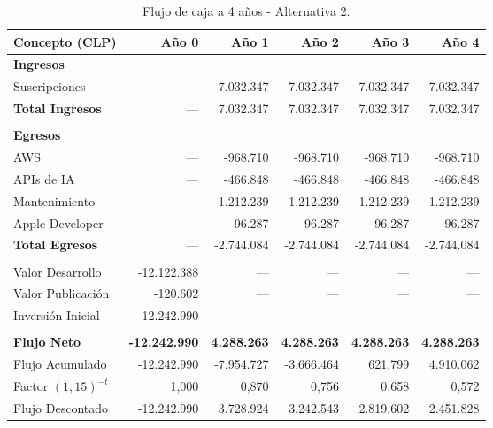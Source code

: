 \documentclass[12pt]{article}
\begin{document}
\begin{table}[h!]
    \centering
    \renewcommand{\arraystretch}{1.3}
    \footnotesize
    \begin{tabular}{|m{3.2cm}|r|r|r|r|r|}
        \hline
        \rowcolor[HTML]{EFEFEF}
        \textbf{Concepto (CLP)} & \textbf{Año 0} & \textbf{Año 1} & \textbf{Año 2} & \textbf{Año 3} & \textbf{Año 4} \\ \hline
        
        \textbf{Ingresos } &&&&&\\ \hline
        Suscripciones & --- & 7.032.347 & 7.032.347 & 7.032.347 & 7.032.347 \\ \hline
        \rowcolor[HTML]{E8F5E9}
        \textbf{Total Ingresos} & --- & 7.032.347 & 7.032.347 & 7.032.347 & 7.032.347 \\ \hline
        & & & & & \\ \hline
        \textbf{Egresos} & & & & & \\ \hline
        AWS & --- & -968.710 & -968.710 & -968.710 & -968.710 \\ \hline
        APIs de IA & --- & -466.848 & -466.848 & -466.848 & -466.848 \\ \hline
        Mantenimiento & --- & -1.212.239 & -1.212.239 & -1.212.239 & -1.212.239 \\ \hline
        Apple Developer & --- & -96.287 & -96.287 & -96.287 & -96.287 \\ \hline
        \rowcolor[HTML]{F3E5F5}
        \textbf{Total Egresos} & --- & -2.744.084 & -2.744.084 & -2.744.084 & -2.744.084 \\ \hline
        & & & & & \\ \hline
        Valor Desarrollo & -12.122.388 & --- & --- & --- & --- \\ \hline
        Valor Publicación & -120.602 & --- & --- & --- & --- \\ \hline
        \rowcolor[HTML]{F3E5F5} 
        Inversión Inicial & -12.242.990 & --- & --- & --- & --- \\ \hline
        & & & & & \\ \hline
        \rowcolor[HTML]{E8F5E9}
        \textbf{Flujo Neto} & \textbf{-12.242.990} & \textbf{4.288.263} & \textbf{4.288.263} & \textbf{4.288.263} & \textbf{4.288.263} \\ \hline
        Flujo Acumulado & -12.242.990 & -7.954.727 & -3.666.464 & 621.799 & 4.910.062 \\ \hline
        \rowcolor[HTML]{F3E5F5}
        Factor $(1{,}15)^{-t}$ & 1,000 & 0,870 & 0,756 & 0,658 & 0,572 \\ \hline
        \rowcolor[HTML]{F3E5F5}
        Flujo Descontado & -12.242.990 & 3.728.924 & 3.242.543 & 2.819.602 & 2.451.828 \\ \hline
    \end{tabular}
    \caption{Flujo de caja a 4 años - Alternativa 2.}
    \label{tab:flujo_alt2}
\end{table}
\end{document}
